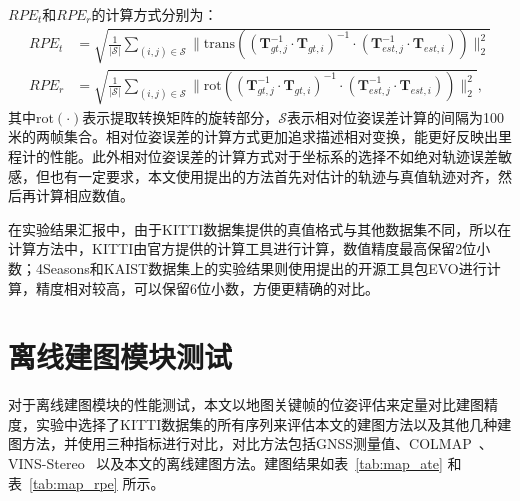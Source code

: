 $RPE_{t}$和$RPE_{r}$的计算方式分别为：
\begin{align}
  RPE_{t} &= \sqrt{\frac{1}{|\mathcal{S}|}\sum_{(i,j) \in \mathcal{S}}\| \text{trans}\left ((\symbf{T}_{gt,j}^{-1} \cdot \symbf{T}_{gt,i})^{-1}\cdot (\symbf{T}_{est,j}^{-1} \cdot \symbf{T}_{est,i}) \right ) \|_2^2} \\
  RPE_{r} &= \sqrt{\frac{1}{|\mathcal{S}|}\sum_{(i,j) \in \mathcal{S}}\| \text{rot}\left ((\symbf{T}_{gt,j}^{-1} \cdot \symbf{T}_{gt,i})^{-1}\cdot (\symbf{T}_{est,j}^{-1} \cdot \symbf{T}_{est,i}) \right ) \|_2^2},
\end{align}
其中$\text{rot}(\cdot)$表示提取转换矩阵的旋转部分，$\mathcal{S}$表示相对位姿误差计算的间隔为100米的两帧集合。相对位姿误差的计算方式更加追求描述相对变换，能更好反映出里程计的性能。此外相对位姿误差的计算方式对于坐标系的选择不如绝对轨迹误差敏感，但也有一定要求，本文使用\citet{li2023textslam}提出的方法首先对估计的轨迹与真值轨迹对齐，然后再计算相应数值。

在实验结果汇报中，由于KITTI数据集提供的真值格式与其他数据集不同，所以在计算方法中，KITTI由官方提供的计算工具进行计算，数值精度最高保留2位小数；4Seasons和KAIST数据集上的实验结果则使用\citet{grupp2017evo}提出的开源工具包EVO进行计算，精度相对较高，可以保留6位小数，方便更精确的对比。

\section{离线建图模块测试}
对于离线建图模块的性能测试，本文以地图关键帧的位姿评估来定量对比建图精度，实验中选择了KITTI数据集的所有序列来评估本文的建图方法以及其他几种建图方法，并使用三种指标进行对比，对比方法包括GNSS测量值、COLMAP~\cite{schonberger2016structure}、VINS-Stereo~\cite{qin2019a} 以及本文的离线建图方法。建图结果如表~\ref{tab:map_ate} 和表~\ref{tab:map_rpe} 所示。

